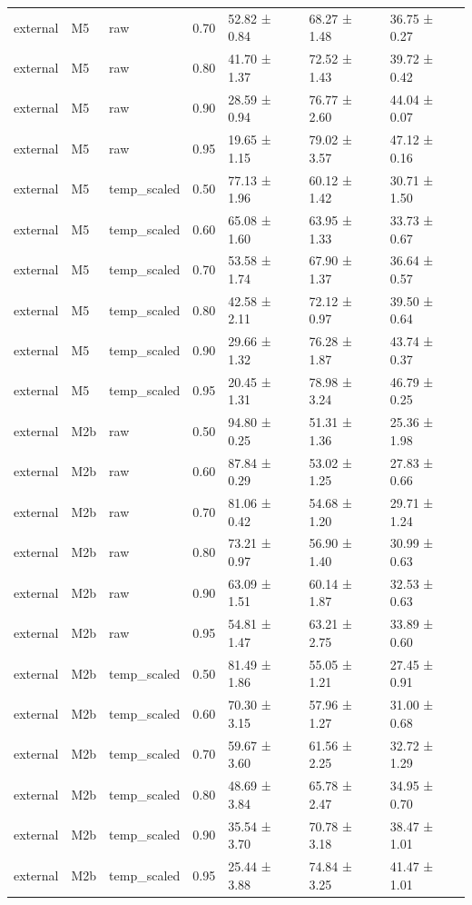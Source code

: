 \begin{tabular}{lllrlll}
external & M5 & raw & 0.70 & 52.82 ± 0.84 & 68.27 ± 1.48 & 36.75 ± 0.27 \\
external & M5 & raw & 0.80 & 41.70 ± 1.37 & 72.52 ± 1.43 & 39.72 ± 0.42 \\
external & M5 & raw & 0.90 & 28.59 ± 0.94 & 76.77 ± 2.60 & 44.04 ± 0.07 \\
external & M5 & raw & 0.95 & 19.65 ± 1.15 & 79.02 ± 3.57 & 47.12 ± 0.16 \\
external & M5 & temp\_scaled & 0.50 & 77.13 ± 1.96 & 60.12 ± 1.42 & 30.71 ± 1.50 \\
external & M5 & temp\_scaled & 0.60 & 65.08 ± 1.60 & 63.95 ± 1.33 & 33.73 ± 0.67 \\
external & M5 & temp\_scaled & 0.70 & 53.58 ± 1.74 & 67.90 ± 1.37 & 36.64 ± 0.57 \\
external & M5 & temp\_scaled & 0.80 & 42.58 ± 2.11 & 72.12 ± 0.97 & 39.50 ± 0.64 \\
external & M5 & temp\_scaled & 0.90 & 29.66 ± 1.32 & 76.28 ± 1.87 & 43.74 ± 0.37 \\
external & M5 & temp\_scaled & 0.95 & 20.45 ± 1.31 & 78.98 ± 3.24 & 46.79 ± 0.25 \\
external & M2b & raw & 0.50 & 94.80 ± 0.25 & 51.31 ± 1.36 & 25.36 ± 1.98 \\
external & M2b & raw & 0.60 & 87.84 ± 0.29 & 53.02 ± 1.25 & 27.83 ± 0.66 \\
external & M2b & raw & 0.70 & 81.06 ± 0.42 & 54.68 ± 1.20 & 29.71 ± 1.24 \\
external & M2b & raw & 0.80 & 73.21 ± 0.97 & 56.90 ± 1.40 & 30.99 ± 0.63 \\
external & M2b & raw & 0.90 & 63.09 ± 1.51 & 60.14 ± 1.87 & 32.53 ± 0.63 \\
external & M2b & raw & 0.95 & 54.81 ± 1.47 & 63.21 ± 2.75 & 33.89 ± 0.60 \\
external & M2b & temp\_scaled & 0.50 & 81.49 ± 1.86 & 55.05 ± 1.21 & 27.45 ± 0.91 \\
external & M2b & temp\_scaled & 0.60 & 70.30 ± 3.15 & 57.96 ± 1.27 & 31.00 ± 0.68 \\
external & M2b & temp\_scaled & 0.70 & 59.67 ± 3.60 & 61.56 ± 2.25 & 32.72 ± 1.29 \\
external & M2b & temp\_scaled & 0.80 & 48.69 ± 3.84 & 65.78 ± 2.47 & 34.95 ± 0.70 \\
external & M2b & temp\_scaled & 0.90 & 35.54 ± 3.70 & 70.78 ± 3.18 & 38.47 ± 1.01 \\
external & M2b & temp\_scaled & 0.95 & 25.44 ± 3.88 & 74.84 ± 3.25 & 41.47 ± 1.01 \\

\end{tabular}

